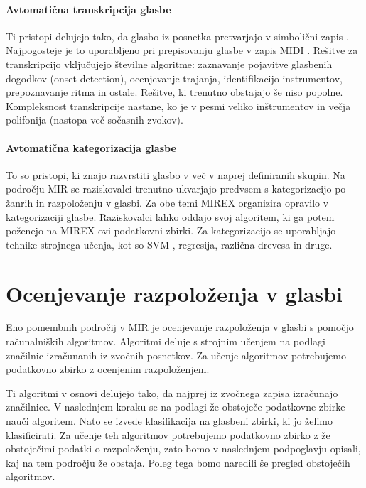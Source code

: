 \documentclass[a4paper, 12pt]{book}
\begin{document}
{\paragraph{Avtomatična transkripcija glasbe}

Ti pristopi delujejo tako, da glasbo iz posnetka pretvarjajo v simbolični zapis \cite{Gerhard, Klapuri2006, Klapuri2004}. Najpogosteje je to uporabljeno pri prepisovanju glasbe v zapis MIDI \cite{Smith1983}. Rešitve za transkripcijo vključujejo številne algoritme: zaznavanje pojavitve glasbenih dogodkov (onset detection), ocenjevanje trajanja, identifikacijo instrumentov, prepoznavanje ritma in ostale. Rešitve, ki trenutno obstajajo še niso popolne. Kompleksnost transkripcije nastane, ko je v pesmi veliko inštrumentov in večja polifonija (nastopa več sočasnih zvokov). 

\paragraph{Avtomatična kategorizacija glasbe}

To so pristopi, ki znajo razvrstiti glas\-bo v več v naprej definiranih skupin. Na področju MIR se raziskovalci trenutno ukvarjajo predvsem s kategorizacijo po žanrih in razpoloženju v glasbi. Za obe temi MIREX organizira opravilo v kategorizaciji glasbe. Raziskovalci lahko oddajo svoj algoritem, ki ga potem poženejo na MIREX-ovi podatkovni zbirki. Za kategorizacijo se uporabljajo tehnike strojnega učenja, kot so SVM \cite{ben2010user}, regresija, različna drevesa in druge.


\section{Ocenjevanje razpoloženja v glasbi}

Eno pomembnih področij v MIR je ocenjevanje razpoloženja v glasbi s pomočjo računalniških algoritmov. Algoritmi deluje s strojnim učenjem na podlagi značilnic izračunanih iz zvočnih posnetkov. Za učenje algoritmov potrebujemo podatkovno zbirko z ocenjenim razpoloženjem. 

Ti algoritmi v osnovi delujejo tako, da najprej iz zvočnega zapisa izračunajo značilnice. V naslednjem koraku se na podlagi že obstoječe podatkovne zbirke nauči algoritem. Nato se izvede klasifikacija na glasbeni zbirki, ki jo želimo klasificirati. Za učenje teh algoritmov potrebujemo podatkovno zbirko z že obstoječimi podatki o razpoloženju, zato bomo v naslednjem podpoglavju opisali, kaj na tem področju že obstaja. Poleg tega bomo naredili še pregled obstoječih algoritmov.

}
\end{document}
